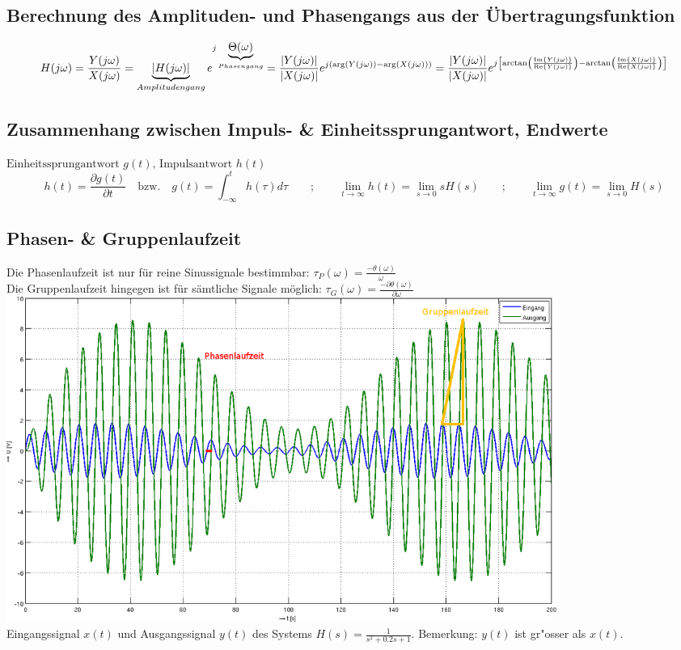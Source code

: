 \subsection{Berechnung des Amplituden- und Phasengangs aus der
Übertragungsfunktion}
$$H(j \omega) = \frac{Y(j \omega)}{X(j \omega)} = \underbrace{|H(j
\omega)|}_{Amplitudengang} e^{j\underbrace{\Theta(\omega)}_{Phasengang}} = 
\frac{|Y(j \omega)|}{|X(j \omega)|} e^{j (\arg(Y(j \omega)) - \arg(X(j
\omega)))} =
\frac{|Y(j \omega)|}{|X(j \omega)|} e^{j \left[\arctan \left(\frac{\operatorname{Im}\{Y(j
\omega)\}}{\operatorname{Re}\{Y(j \omega)\}} \right) - \arctan \left(\frac{\operatorname{Im}\{X(j
\omega)\}}{\operatorname{Re}\{X(j \omega)\}} \right)\right]}$$

\subsection{Zusammenhang zwischen Impuls- \& Einheitssprungantwort, Endwerte
}
$ \text{Einheitssprungantwort } g(t) \text{, Impulsantwort }h(t)$
$$h(t)= \frac{\partial g(t)}{\partial t}\quad\text{bzw.}\quad
g(t)=\int_{-\infty}^{t}h(\tau)d\tau \qquad;\qquad 
\lim\limits_{t \rightarrow \infty}  h(t)= \lim\limits_{s \rightarrow 0} s H(s)
\qquad;\qquad
\lim\limits_{t \rightarrow \infty}  g(t)= \lim\limits_{s \rightarrow 0} H(s)$$

\subsection{Phasen- \& Gruppenlaufzeit }
Die \textcolor{phase}{Phasenlaufzeit}  ist nur für reine Sinussignale bestimmbar:
$\tau_P(\omega)=\frac{-\theta(\omega)}{\omega}$ \\
Die \textcolor{gruppe}{Gruppenlaufzeit} hingegen ist für sämtliche Signale möglich:
$\tau_G(\omega)=\frac{-\partial\theta(\omega)}{\partial\omega}$\\
\includegraphics[width=18cm]{./bilder/laufzeit.png}\\
Eingangssignal $x(t)$ und Ausgangssignal $y(t)$ des Systems
$H(s)=\frac{1}{s^2+0.2s+1}$. Bemerkung: $y(t)$ ist gr"osser als $x(t)$.

